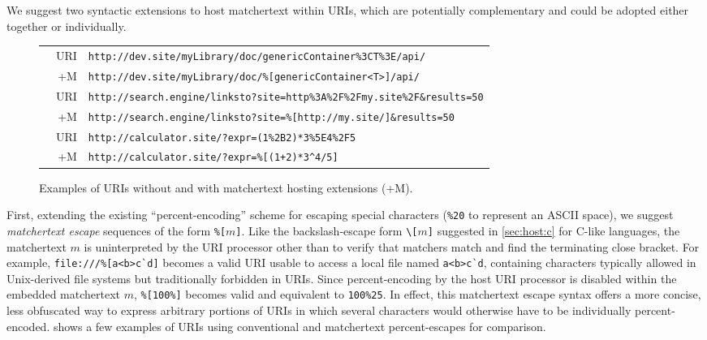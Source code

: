 We suggest two syntactic extensions
to host matchertext within URIs,
which are potentially complementary
and could be adopted either together or individually.

\begin{figure*}
\begin{center}
\begin{footnotesize}
\begin{tabular}{lrl}
& URI	& \verb|http://dev.site/myLibrary/doc/genericContainer%3CT%3E/api/| \\
& +M	& \verb|http://dev.site/myLibrary/doc/%[genericContainer<T>]/api/| \\
& URI	& \verb|http://search.engine/linksto?site=http%3A%2F%2Fmy.site%2F&results=50| \\
& +M	& \verb|http://search.engine/linksto?site=%[http://my.site/]&results=50| \\
& URI	& \verb|http://calculator.site/?expr=(1%2B2)*3%5E4%2F5| \\
& +M	& \verb|http://calculator.site/?expr=%[(1+2)*3^4/5]| \\
\end{tabular}
\end{footnotesize}
\end{center}
\caption{Examples of URIs without and with matchertext hosting extensions (+M).}
\label{fig:host:uri-examples}
\end{figure*}

First, extending the existing ``percent-encoding'' scheme
for escaping special characters
(\eg \verb|%20| to represent an ASCII space),
we suggest \emph{matchertext escape} sequences
of the form \verb|%[|$m$\verb|]|.
Like the backslash-escape form \verb|\[|$m$\verb|]|
suggested in \cref{sec:host:c} for C-like languages,
the matchertext $m$ is uninterpreted by the URI processor
other than to verify that matchers match
and find the terminating close bracket.
For example, \verb|file:///%[a<b>c`d]| becomes
a valid URI usable to access a local file named \verb|a<b>c`d|,
containing characters typically allowed in Unix-derived file systems
but traditionally forbidden in URIs.
Since percent-encoding by the host URI processor
is disabled within the embedded matchertext $m$,
\verb|%[100%]| becomes valid and equivalent to \verb|100%25|.
In effect, this matchertext escape syntax offers
a more concise, less obfuscated way to express arbitrary portions of URIs
in which several characters
would otherwise have to be individually percent-encoded.
 shows a few examples of URIs
using conventional and matchertext percent-escapes for comparison.

